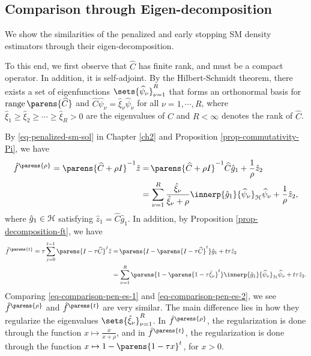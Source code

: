 \subsection{Comparison through Eigen-decomposition}

We show the similarities of the penalized and early stopping SM density estimators through their eigen-decomposition. 

To this end, we first observe that $\widehat{C}$ has finite rank, and must be a compact operator. In addition, it is self-adjoint. By the Hilbert-Schmidt theorem, there exists a set of eigenfunctions $\sets{\widehat{\psi}_{\nu}}_{\nu=1}^{R}$ that forms an orthonormal basis for $\range \parens{\widehat{C}}$ and $\widehat{C} \widehat{\psi}_{\nu} = \hat{\xi}_{\nu} \widehat{\psi}_{\nu}$ for all $\nu = 1, \cdots, R$, where $\hat{\xi}_1 \ge \hat{\xi}_2 \ge \cdots \ge \hat{\xi}_R > 0$ are the eigenvalues of $\widehat{C}$ and $R < \infty$ denotes the rank of $\widehat{C}$. 

By \eqref{eq-penalized-sm-sol} in Chapter \ref{ch2} and Proposition \ref{prop-commutativity-Pi}, we have 
\begin{align}
	\hat{f}^{\parens{\rho}} = \parens{\widehat{C} + \rho I}^{-1} \hat{z} = & \, \parens{\widehat{C} + \rho I}^{-1} \widehat{C} \hat{g}_1 + \frac{1}{\rho} \hat{z}_2 \nonumber \\ 
	= & \, \sum_{\nu=1}^R \frac{\hat{\xi}_{\nu}}{\hat{\xi}_{\nu} + \rho} \innerp{\hat{g}_1}{\widehat{\psi}_{\nu}}_{\calH} \widehat{\psi}_{\nu} + \frac{1}{\rho} \hat{z}_2, \label{eq-comparison-pen-es-1}
\end{align}
where $\hat{g}_1 \in \mathcal{H}$ satisfying $\hat{z}_1 = \widehat{C} \hat{g}_1$. In addition, by Proposition \ref{prop-decomposition-ft}, we have 
\begin{align}
	\hat{f}^{\parens{t}} = \tau \sum_{j=0}^{t-1} \parens{I - \tau \widehat{C}}^j \hat{z} = & \, \parens{I - \parens{I - \tau \widehat{C}}^{t}} \hat{g}_1 + t \tau \hat{z}_2 \nonumber \\ 
	= & \, \sum_{\nu=1}^R \parens{1 - \parens{1 - \tau \hat{\xi}_{\nu} }^{t}} \innerp{\hat{g}_1}{\widehat{\psi}_{\nu}}_{\calH} \widehat{\psi}_{\nu} + t \tau \hat{z}_2. \label{eq-comparison-pen-es-2}
\end{align}
Comparing \eqref{eq-comparison-pen-es-1} and \eqref{eq-comparison-pen-es-2}, we see $\hat{f}^{\parens{\rho}}$ and $\hat{f}^{\parens{t}}$ are very similar. The main difference lies in how they regularize the eigenvalues $\sets{\hat{\xi}_{\nu}}_{\nu=1}^R$. In $\hat{f}^{\parens{\rho}}$, the regularization is done through the function $x \mapsto \frac{x}{x + \rho}$, and in $\hat{f}^{\parens{t}}$, the regularization is done through the function $x \mapsto 1 - \parens{1 - \tau x}^t$, for $x > 0$. 

